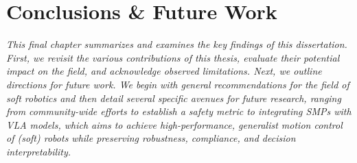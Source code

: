 \chapter{Conclusions \& Future Work}
\label{chp:conclusion}

\textit{
    This final chapter summarizes and examines the key findings of this dissertation. First, we revisit the various contributions of this thesis, evaluate their potential impact on the field, and acknowledge observed limitations. Next, we outline directions for future work. We begin with general recommendations for the field of soft robotics and then detail several specific avenues for future research, ranging from community-wide efforts to establish a safety metric to integrating \glspl{SMP} with \gls{VLA} models, which aims to achieve high-performance, generalist motion control of (soft) robots while preserving robustness, compliance, and decision interpretability.
}

\newpage





